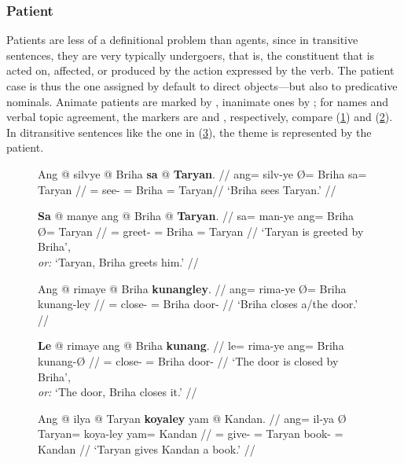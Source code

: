 
\subsubsection{Patient}

Patients are less of a definitional problem than agents, since in transitive
sentences, they are very typically undergoers, that is, the constituent that is
acted on, affected, or produced by the action expressed by the verb. The
patient case is thus the one assigned by default to direct objects---but also
to predicative nominals. Animate patients are marked by ,
inanimate ones by ; for names and verbal topic agreement, the
markers are  and , respectively, compare
(\ref{ex:patmarking1}) and (\ref{ex:patmarking2}). In ditransitive sentences
like the one in (\ref{ex:ditrpat}), the theme is represented by the patient.

\begin{figure}
\pex\label{ex:patmarking1}
\a\begingl
	\gla Ang @ silvye {} @ Briha \textbf{sa} @ \textbf{Taryan}. //
	\glb ang= silv-ye Ø= Briha sa= Taryan //
	\glc \AgtT{}= see-\TsgF{} \Top{}= Briha \Parg{}= Taryan//
	\glft `Briha sees Taryan.' //
\endgl

\a\begingl
	\gla \textbf{Sa} @ manye ang @ Briha {} @ \textbf{Taryan}. //
	\glb sa= man-ye ang= Briha Ø= Taryan //
	\glc \PatT{}= greet-\TsgF{} \Aarg{}= Briha \Top{}= Taryan //
	\glft `Taryan is greeted by Briha',\\
		\textit{or:} `Taryan, Briha greets him.' //
\endgl
\xe
\end{figure}

\begin{figure}
\pex\label{ex:patmarking2}
\a\begingl
	\gla Ang @ rimaye {} @ Briha \textbf{kunangley}. //
	\glb ang= rima-ye Ø= Briha kunang-ley //
	\glc \AgtT{}= close-\TsgF{} \Top{}= Briha door-\PargI{} //
	\glft `Briha closes a/the door.' //
\endgl

\a\begingl
	\gla \textbf{Le} @ rimaye ang @ Briha \textbf{kunang}. //
	\glb le= rima-ye ang= Briha kunang-Ø //
	\glc \PatTI{}= close-\TsgF{} \Aarg{}= Briha door-\Top{} //
	\glft `The door is closed by Briha',\\
		\textit{or:} `The door, Briha closes it.' //
\endgl
\xe
\end{figure}

\begin{figure}
\ex\label{ex:ditrpat}
\begingl
	\gla Ang @ ilya {} @ Taryan \textbf{koyaley} yam @ Kandan. //
	\glb ang= il-ya Ø Taryan= koya-ley yam= Kandan //
	\glc \AgtT{}= give-\TsgM{} \Top{}= Taryan book-\PargI{} \Dat{}= Kandan //
	\glft `Taryan gives Kandan a book.' //
\endgl
\xe
\end{figure}

